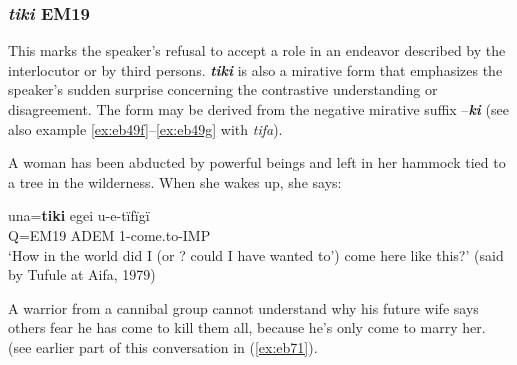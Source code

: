\documentclass[output=paper]{langsci/langscibook}
\begin{document}
\subsubsection{\textit{tiki} EM19} This marks the speaker’s refusal to accept a role in an endeavor described by the interlocutor or by third persons.  \textbf{\textit{tiki}} is also a mirative form that emphasizes the speaker’s sudden surprise concerning the contrastive understanding or disagreement.  The form may be derived from the negative mirative suffix –\textbf{\textit{ki}} (see also example \ref{ex:eb49f}--\ref{ex:eb49g} with \textit{tifa}). 

A woman has been abducted by powerful beings and left in her hammock tied to a tree in the wilderness.  When she wakes up, she says:

\begin{exe}
\ex \label{ex:eb44}
	\gll una=\textbf{tiki} egei u-e-tïfïgï\\
	Q=EM19 ADEM 1-come.to-IMP\\
	\trans  ‘How in the world did I (or ? could I have wanted to’) come here like this?’ (said by Tufule at Aifa, 1979)
\end{exe}

A warrior from a cannibal group cannot understand why his future wife says others fear he has come to kill them all, because he’s only come to marry her. (see earlier part of this conversation in (\ref{ex:eb71}).
\end{document}
